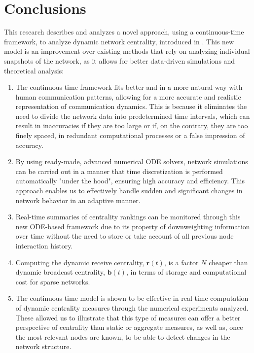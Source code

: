 
\chapter{Conclusions}
\label{chap:concl}

This research describes and analyzes a novel approach, using a continuous-time framework, to analyze dynamic network centrality, introduced in \cite{grindrod2014dynamical}. This new model is an improvement over existing methods that rely on analyzing individual snapshots of the network, as it allows for better data-driven simulations and theoretical analysis:

\begin{enumerate}[label=(\roman*)]
  \item The continuous-time framework fits better and in a more natural way with human communication patterns, allowing for a more accurate and realistic representation of communication dynamics. This is because it eliminates the need to divide the network data into predetermined time intervals, which can result in inaccuracies if they are too large or if, on the contrary, they are too finely spaced, in redundant computational processes or a false impression of accuracy.
  \item By using ready-made, advanced numerical ODE solvers, network simulations can be carried out in a manner that time discretization is performed automatically "under the hood", ensuring high accuracy and efficiency. This approach enables us to effectively handle sudden and significant changes in network behavior in an adaptive manner.
  \item Real-time summaries of centrality rankings can be monitored through this new ODE-based framework due to its property of downweighting information over time without the need to store or take account of all previous node interaction history.
  \item Computing the dynamic receive centrality, $\mathbf{r}(t)$, is a factor $N$ cheaper than dynamic broadcast centrality, $\mathbf{b}(t)$, in terms of storage and computational cost for sparse networks.
  \item The continuous-time model is shown to be effective in real-time computation of dynamic centrality measures through the numerical experiments analyzed. These allowed us to illustrate that this type of measures can offer a better perspective of centrality than static or aggregate measures, as well as, once the most relevant nodes are known, to be able to detect changes in the network structure.
\end{enumerate}






